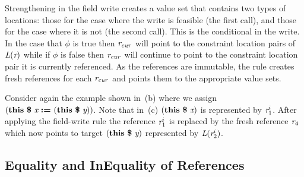 Strengthening in the field write creates a value set that
contains two types of locations:  those for the case where the write is feasible (the
first call), and those for the case where it is not (the second call). 
This is the conditional in the write. In the case that $\phi$ is true
then $\emph{r}_\mathit{cur}$ will point to the constraint location pairs of
$\emph{L}(\emph{r})$ while if $\phi$ is false then $\emph{r}_\mathit{cur}$ will continue
to point to the constraint location pair it is currently referenced.
As the references are immutable, the rule creates fresh references for
each $\emph{r}_\mathit{cur}$ and points them to the appropriate value sets.

Consider again the example shown in~(b) where we assign
$\lp\cfgt{this}\  \cfgt{\$}\ \cfgnt{x}\ \cfgt{:=}\ \lp\cfgt{this}\  \cfgt{\$}\ \cfgnt{y}\rp\rp$. Note that
in~(c) $\lp\cfgt{this}\  \cfgt{\$}\ \cfgnt{x}\rp$ is represented by
$\emph{r}_1^i$. After applying the field-write rule the reference $\emph{r}_1^i$ is
replaced by the fresh reference $\emph{r}_4$ which now points to target
 $\lp\cfgt{this}\  \cfgt{\$}\ \cfgnt{y}\rp$ represented by $\emph{L}(\emph{r}_2^i)$.


\begin{comment}
\begin{figure}[t]
\begin{center}
\begin{tabular}[c]{l}
$\Psi_x = \{ (true\ \cfgnt{l}_0\ \cfgnt{r}_1^i) \}$\\
$ST (\cfgnt{L}, \cfgnt{r}_3^s, \phi, \phi_g)$ \\
$\theta = \{ (\phi_{2a}\; \cfgnt{l}_\mathit{null} ) (\phi_{2b}\; \cfgnt{l}_2) (\phi_{2c}\; \cfgnt{l}_1) \}$\\
$ST(\cfgnt{L}, \cfgnt{r}_0, \phi, \phi_g)$\\
$\theta = \{ \}$\\
\end{tabular}
\end{center}
\caption{FIXME: When will I get a caption}
\label{fig:faHeapSets}
\end{figure}
\end{comment}



\subsection{Equality and InEquality of References}


